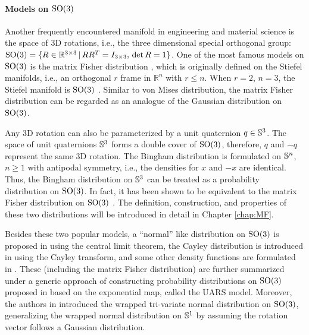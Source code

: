 \paragraph{Models on $\mathrm{SO}(3)$}

Another frequently encountered manifold in engineering and material science is the space of 3D rotations, i.e., the three dimensional special orthogonal group: $\mathrm{SO}(3) = \{ R\in\mathbb{R}^{3\times 3} \,|\, RR^T = I_{3\times 3}, \, \det R = 1\}$.
One of the most famous models on $\mathrm{SO}(3)$ is the matrix Fisher distribution \cite{downs1972orientation,khatri1977mises}, which is originally defined on the Stiefel manifolds, i.e., an orthogonal $r$ frame in $\mathbb{R}^n$ with $r\leq n$.
When $r=2$, $n=3$, the Stiefel manifold is $\mathrm{SO}(3)$ \cite[Chapter 13.2.1]{mardia2009directional}.
Similar to von Mises distribution, the matrix Fisher distribution can be regarded as an analogue of the Gaussian distribution on $\mathrm{SO}(3)$.

Any 3D rotation can also be parameterized by a unit quaternion $q\in\mathbb{S}^3$.
The space of unit quaternions $\mathbb{S}^3$ forms a double cover of $\mathrm{SO}(3)$, therefore, $q$ and $-q$ represent the same 3D rotation.
The Bingham distribution \cite{bingham1974antipodally} is formulated on $\mathbb{S}^n$, $n\geq 1$ with antipodal symmetry, i.e., the densities for $x$ and $-x$ are identical.
Thus, the Bingham distribution on $\mathbb{S}^3$ can be treated as a probability distribution on $\mathrm{SO}(3)$.
In fact, it has been shown to be equivalent to the matrix Fisher distribution on $\mathrm{SO}(3)$ \cite{prentice1986orientation}.
The definition, construction, and properties of these two distributions will be introduced in detail in Chapter \ref{chap:MF}.

Besides these two popular models, a ``normal'' like distribution on $\mathrm{SO}(3)$ is proposed in \cite{nikolayev1997normal} using the central limit theorem,
the Cayley distribution is introduced in \cite{leon2006statistical} using the Cayley transform,
and some other density functions are formulated in \cite{bunge2013texture,matthies1982form}.
These (including the matrix Fisher distribution) are further summarized under a generic approach of constructing probability distributions on $\mathrm{SO}(3)$ proposed in \cite{qiu2014wrapped} based on the exponential map, called the UARS model.
Moreover, the authors in \cite{qiu2014wrapped} introduced the wrapped tri-variate normal distribution on $\mathrm{SO}(3)$, generalizing the wrapped normal distribution on $\mathbb{S}^1$ by assuming the rotation vector follows a Gaussian distribution.

